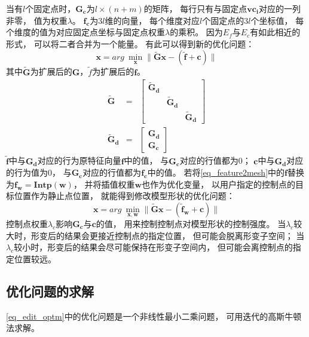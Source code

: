 当有$l$个固定点时，$\bm{G_c}$为$l \times (n+m)$的矩阵，
每行只有与固定点$\bm{vc_i}$对应的一列非零，
值为权重$\lambda$。
$\bm{f_c}$为$3l$维的向量，
每个维度对应$l$个固定点的$3l$个坐标值，
每个维度的值为对应固定点坐标与固定点权重$\lambda$的乘积。
因为$E_f$与$E_c$有如此相近的形式，
可以将二者合并为一个能量。
有此可以得到新的优化问题：
\begin{equation}
    \label{eq_feature2mesh}
    \bm{x}=arg\ \min_{\bm{x}} \| \bm{\widetilde{G}x}-(\widetilde{\bm{f}}+\bm{c}) \|
\end{equation}
其中$\bm{\widetilde{G}}$为扩展后的$\bm{G}$，$\widetilde{f}$为扩展后的$\bm{f}$。
\begin{eqnarray}
    \bm{\widetilde{G}}&=&
    \begin{bmatrix}
        \bm{\widetilde{G}_d} &        & \\ 
         &       \bm{\widetilde{G}_d} & \\ 
         &       &                  \bm{\widetilde{G}_d}
    \end{bmatrix}\\
    \bm{\widetilde{G}_d}&=&
    \begin{bmatrix}
        \bm{G_d} \\ 
        \bm{G_c}
    \end{bmatrix}
\end{eqnarray}
$\widetilde{\bm{f}}$中与$\bm{G_d}$对应的行为原特征向量$\bm{f}$中的值，
与$\bm{\bm{G_c}}$对应的行值都为0；
$\bm{c}$中与$\bm{G_d}$对应的行为值为0，
与$\bm{\bm{G_c}}$对应的行值都为$\bm{f_c}$中的值。
若将\ref{eq_feature2mesh}中的$\bm{f}$替换为$\bm{f_w}=\bm{Intp}(\bm{w})$，
并将插值权重$\bm{w}$也作为优化变量，
以用户指定的控制点的目标位置作为静止点位置，
就能得到修改模型形状的优化问题：
\begin{equation}
    \label{eq_edit_optm}
    \bm{x}=arg\ \min_{\bm{x},\bm{w}}
    \|
        \widetilde{\bm{G}}\bm{x} 
        -
        (\widetilde{\bm{f}}_{\bm{w}}+\bm{c}) 
    \|
\end{equation}
控制点权重$\lambda_c$影响$\bm{G_c}$与$\bm{c}$的值，
用来控制控制点对模型形状的控制强度。
当$\lambda_c$较大时，形变后的结果会更接近控制点的指定位置，
但可能会脱离形变子空间；
当$\lambda_c$较小时，形变后的结果会尽可能保持在形变子空间内，
但可能会离控制点的指定位置较远。
\subsection{优化问题的求解}
\ref{eq_edit_optm}中的优化问题是一个非线性最小二乘问题，
可用迭代的高斯牛顿法求解。

